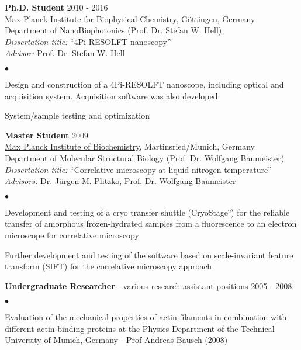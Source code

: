 \documentclass[margin,line]{res}
\newenvironment{list2}{
  \begin{list}{$\bullet$}{%
      \setlength{\itemsep}{0in}
      \setlength{\parsep}{0in} \setlength{\parskip}{0in}
      \setlength{\topsep}{0in} \setlength{\partopsep}{0in} 
      \setlength{\leftmargin}{0.2in}}}{\end{list}}
\begin{document}
\begin{resume}
{\bf Ph.D. Student} \hfill {2010 - 2016}\\
\href{https://www.mpibpc.mpg.de/en}{Max Planck Institute for Biophysical Chemistry}, Göttingen, Germany\\
\href{http://www.4pi.de/}{Department of NanoBiophotonics (Prof. Dr. Stefan W. Hell)}\\
{\it Dissertation title:} “4Pi-RESOLFT nanoscopy”\\
{\it Advisor:} Prof. Dr. Stefan W. Hell\\
\vspace*{-2mm}
\begin{list2}
\vspace*{-1mm}
\item Design and construction of a 4Pi-RESOLFT nanoscope, including optical and acquisition system. Acquisition software was also developed. 
\item System/sample testing and optimization
\end{list2}
{\bf Master Student} \hfill {2009}\\
\href{https://www.biochem.mpg.de/en}{Max Planck Institute of Biochemistry}, Martinsried/Munich, Germany\\
\href{https://www.biochem.mpg.de/baumeister}{Department of Molecular Structural Biology (Prof. Dr. Wolfgang Baumeister)}\\
{\it Dissertation title:} “Correlative microscopy at liquid nitrogen temperature”\\
{\it Advisors:} Dr. Jürgen M. Plitzko, Prof. Dr. Wolfgang Baumeister\\
\vspace*{-2mm}
\begin{list2}
\vspace*{-1mm}
\item Development and testing of a cryo transfer shuttle (CryoStage²) for the reliable transfer of amorphous frozen-hydrated samples from a fluorescence to an electron microscope for correlative microscopy
\item Further development and testing of the software based on scale-invariant feature transform (SIFT) for the correlative microscopy approach
\end{list2}
{\bf Undergraduate Researcher} - various research assistant positions \hfill {2005 - 2008}\\
\vspace*{-2mm}
\begin{list2}
\vspace*{-1mm}
\item Evaluation of the mechanical properties of actin filaments in combination with different actin-binding proteins at the Physics Department of the Technical University of Munich, Germany - Prof Andreas Bausch (2008)

\end{list2}
\end{resume}
\end{document}
